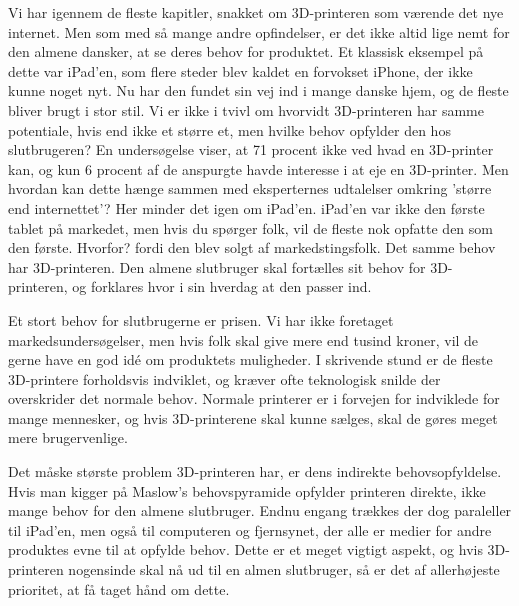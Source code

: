 Vi har igennem de fleste kapitler, snakket om 3D-printeren som værende det nye internet. Men som med så mange andre opfindelser, er det ikke altid lige nemt for den almene dansker, at se deres behov for produktet. Et klassisk eksempel på dette var iPad'en, som flere steder blev kaldet en forvokset iPhone, der ikke kunne noget nyt. Nu har den fundet sin vej ind i mange danske hjem, og de fleste bliver brugt i stor stil. 
Vi er ikke i tvivl om hvorvidt 3D-printeren har samme potentiale, hvis end ikke et større et, men hvilke behov opfylder den hos slutbrugeren? En undersøgelse viser, at 71 procent ikke ved hvad en 3D-printer kan, og kun 6 procent af de anspurgte havde interesse i at eje en 3D-printer.
Men hvordan kan dette hænge sammen med eksperternes udtalelser omkring 'større end internettet'? \autocite{financial_times_3d_2012} Her minder det igen om iPad'en. iPad'en var ikke den første tablet på markedet, men hvis du spørger folk, vil de fleste nok opfatte den som den første. Hvorfor? fordi den blev solgt af markedstingsfolk. Det samme behov har 3D-printeren. Den almene slutbruger skal fortælles sit behov for 3D-printeren, og forklares hvor i sin hverdag at den passer ind.

Et stort behov for slutbrugerne er prisen. Vi har ikke foretaget markedsundersøgelser, men hvis folk skal give mere end tusind kroner, vil de gerne have en god idé om produktets muligheder. I skrivende stund er de fleste 3D-printere forholdsvis indviklet, og kræver ofte teknologisk snilde der overskrider det normale behov. Normale printerer er i forvejen for indviklede for mange mennesker, og hvis 3D-printerene skal kunne sælges, skal de gøres meget mere brugervenlige.

Det måske største problem 3D-printeren har, er dens indirekte behovsopfyldelse. Hvis man kigger på Maslow's behovspyramide \autocite{abraham_harold_maslow_theory_1943} opfylder printeren direkte, ikke mange behov for den almene slutbruger. Endnu engang trækkes der dog paraleller til iPad'en, men også til computeren og fjernsynet, der alle er medier for andre produktes evne til at opfylde behov. Dette er et meget vigtigt aspekt, og hvis 3D-printeren nogensinde skal nå ud til en almen slutbruger, så er det af allerhøjeste prioritet, at få taget hånd om dette.